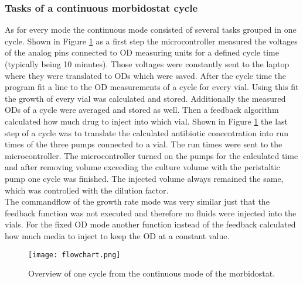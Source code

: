 \subsubsection{Tasks of a continuous morbidostat cycle}
As for every mode the continuous mode consisted of several tasks grouped in one cycle. Shown in Figure \ref{figure:flowchart} as a first step the microcontroller measured the voltages of the analog pins connected to OD measuring units for a defined cycle time (typically being 10 minutes). Those voltages were constantly sent to the laptop where they were translated to ODs which were saved. After the cycle time the program fit a line to the OD measurements of a cycle for every vial. Using this fit the growth of every vial was calculated and stored. Additionally the measured ODs of a cycle were averaged and stored as well. Then a feedback algorithm calculated how much drug to inject into which vial. Shown in Figure \ref{figure:flowchart} the last step of a cycle was to translate the calculated antibiotic concentration into run times of the three pumps connected to a vial. The run times were sent to the microcontroller. The microcontroller turned on the pumps for the calculated time and after removing volume exceeding the culture volume with the peristaltic pump one cycle was finished. The injected volume always remained the same, which was controlled with the dilution factor.  \\
The commandflow of the growth rate mode was very similar just that the feedback function was not executed and therefore no fluids were injected into the vials. For the fixed OD mode another function instead of the feedback  calculated how much media to inject to keep the OD at a constant value. 

\begin{figure}
	\texttt{[image: flowchart.png]}
	\caption{Overview of one cycle from the continuous mode of the morbidostat.}
	\label{figure:flowchart}	
\end{figure}

